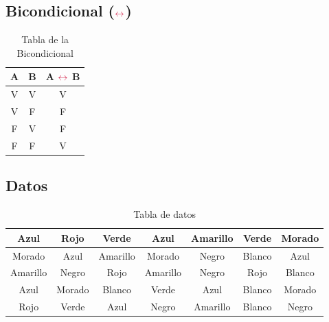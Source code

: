 \documentclass[11pt, a4paper]{article}
\begin{document}
    \textcolor{violeta1}{\subsection{\textbf{Bicondicional ($\textcolor{rojo1}{\leftrightarrow}$)}}}
    \begin{table}[ht]
        \begin{center}
            \caption{Tabla de la Bicondicional}
            \vspace{4mm}
            \begin{tabular}{c c| c}
                \textcolor{verde1}{A} & \textcolor{violeta1}{B} & \textcolor{verde1}{A} $\textcolor{rojo1}{\leftrightarrow} $ \textcolor{violeta1}{B} \\
                \hline 
                \textcolor{naranja1}{V} & \textcolor{naranja1}{V} & \textcolor{naranja1}{V} \\
                \textcolor{naranja1}{V} & \textcolor{azul1}{F}  & \textcolor{azul1}{F} \\
                \textcolor{azul1}{F}  & \textcolor{naranja1}{V} &  \textcolor{azul1}{F} \\
                \textcolor{azul1}{F} & \textcolor{azul1}{F} &  \textcolor{naranja1}{V} \\
            \end{tabular}
        \end{center}
    \end{table}
    
    \textcolor{rojo1}{\section{Datos}}
    \begin{table}[ht]
        \begin{center}
            \caption{Tabla de datos}
            \vspace{4mm}
            \begin{tabular}{|c|c|c|c|c|c|c|}
                \hline
                Azul & Rojo & Verde & Azul & Amarillo & Verde & Morado \\
                \hline
                Morado & Azul & Amarillo & Morado & Negro & Blanco & Azul \\
                \hline
                Amarillo & Negro &  Rojo & Amarillo & Negro & Rojo & Blanco \\
                \hline 
                Azul & Morado & Blanco & Verde & Azul & Blanco & Morado \\
                \hline
                 Rojo & Verde & Azul & Negro & Amarillo & Blanco & Negro \\
                \hline
            \end{tabular}
        \end{center}
    \end{table}
    
\end{document}
